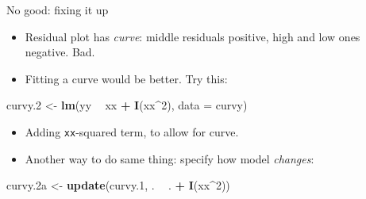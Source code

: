 \documentclass[ignorenonframetext,]{beamer}
\newenvironment{Shaded}{\begin{snugshade}}{\end{snugshade}}
\newcommand{\DataTypeTok}[1]{\textcolor[rgb]{0.13,0.29,0.53}{#1}}
\newcommand{\DecValTok}[1]{\textcolor[rgb]{0.00,0.00,0.81}{#1}}
\newcommand{\FloatTok}[1]{\textcolor[rgb]{0.00,0.00,0.81}{#1}}
\newcommand{\KeywordTok}[1]{\textcolor[rgb]{0.13,0.29,0.53}{\textbf{#1}}}
\newcommand{\NormalTok}[1]{#1}
\newcommand{\OperatorTok}[1]{\textcolor[rgb]{0.81,0.36,0.00}{\textbf{#1}}}
\newcommand{\StringTok}[1]{\textcolor[rgb]{0.31,0.60,0.02}{#1}}
\begin{document}
\begin{frame}[fragile]{No good: fixing it up}
\protect\hypertarget{no-good-fixing-it-up}{}

\begin{itemize}
\item
  Residual plot has \emph{curve}: middle residuals positive, high and
  low ones negative. Bad.
\item
  Fitting a curve would be better. Try this:
\end{itemize}

\begin{Shaded}
\begin{Highlighting}[]
\NormalTok{curvy}\FloatTok{.2}\NormalTok{ <-}\StringTok{ }\KeywordTok{lm}\NormalTok{(yy }\OperatorTok{~}\StringTok{ }\NormalTok{xx }\OperatorTok{+}\StringTok{ }\KeywordTok{I}\NormalTok{(xx}\OperatorTok{^}\DecValTok{2}\NormalTok{), }\DataTypeTok{data =}\NormalTok{ curvy)}
\end{Highlighting}
\end{Shaded}

\begin{itemize}
\item
  Adding \texttt{xx}-squared term, to allow for curve.
\item
  Another way to do same thing: specify how model \emph{changes}:
\end{itemize}

\begin{Shaded}
\begin{Highlighting}[]
\NormalTok{curvy}\FloatTok{.2}\NormalTok{a <-}\StringTok{ }\KeywordTok{update}\NormalTok{(curvy}\FloatTok{.1}\NormalTok{, . }\OperatorTok{~}\StringTok{ }\NormalTok{. }\OperatorTok{+}\StringTok{ }\KeywordTok{I}\NormalTok{(xx}\OperatorTok{^}\DecValTok{2}\NormalTok{))}
\end{Highlighting}
\end{Shaded}

\end{frame}
\end{document}
